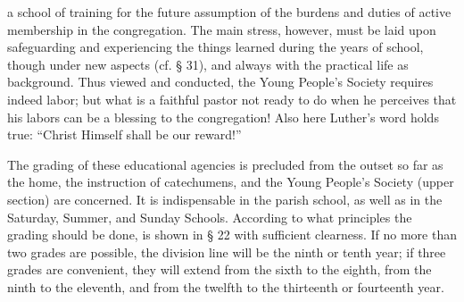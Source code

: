 a school of training for the future assumption of the burdens and duties of active membership in the congregation. The main stress, however, must be laid upon safeguarding and experiencing the things learned during the years of school, though under new aspects (cf. § 31), and always with the practical life as background. Thus viewed and conducted, the Young People’s Society requires indeed labor; but what is a faithful pastor not ready to do when he perceives that his labors can be a blessing to the congregation! Also here Luther’s word holds true: “Christ Himself shall be our reward!”

The grading of these educational agencies is precluded from the outset so far as the home, the instruction of catechumens, and the Young People’s Society (upper section) are concerned. It is indispensable in the parish school, as well as in the Saturday, Summer, and Sunday Schools. According to what principles the grading should be done, is shown in § 22 with sufficient clearness. If no more than two grades are possible, the division line will be the ninth or tenth year; if three grades are convenient, they will extend from the sixth to the eighth, from the ninth to the eleventh, and from the twelfth to the thirteenth or fourteenth year.
